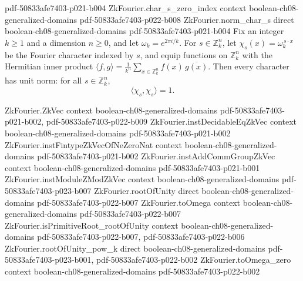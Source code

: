 \begin{lemma}
  {pdf-50833afe7403-p021-b004}
\proofstep
  {ZkFourier.char_s_zero_index}
  {context}
  {boolean-ch08-generalized-domains}
  {pdf-50833afe7403-p022-b008}
\proofstep
  {ZkFourier.norm_char_s}
  {direct}
  {boolean-ch08-generalized-domains}
  {pdf-50833afe7403-p021-b004}
Fix an integer $k \ge 1$ and a dimension $n \ge 0$, and let $\omega_k = e^{2\pi i/k}$.
For $s \in \mathbb{Z}_k^n$, let $\chi_s(x) = \omega_k^{\,s\cdot x}$ be the Fourier
character indexed by $s$, and equip functions on $\mathbb{Z}_k^n$ with the Hermitian
inner product $\langle f,g\rangle = \frac{1}{k^n}\sum_{x\in\mathbb{Z}_k^n}
f(x)\,\overline{g(x)}$. Then every character has unit norm: for all $s \in
\mathbb{Z}_k^n$, \[ \langle \chi_s, \chi_s\rangle = 1. \]
\end{lemma}

\begin{lemma}
\label{ZkFourier.inner_product_char_nonself}
\leanok
{}
\proofstep
  {ZkFourier.ZkVec}
  {context}
  {boolean-ch08-generalized-domains}
  {pdf-50833afe7403-p021-b002,
    pdf-50833afe7403-p022-b009}
\proofstep
  {ZkFourier.instDecidableEqZkVec}
  {context}
  {boolean-ch08-generalized-domains}
  {pdf-50833afe7403-p021-b002}
\proofstep
  {ZkFourier.instFintypeZkVecOfNeZeroNat}
  {context}
  {boolean-ch08-generalized-domains}
  {pdf-50833afe7403-p021-b002}
\proofstep
  {ZkFourier.instAddCommGroupZkVec}
  {context}
  {boolean-ch08-generalized-domains}
  {pdf-50833afe7403-p021-b001}
\proofstep
  {ZkFourier.instModuleZModZkVec}
  {context}
  {boolean-ch08-generalized-domains}
  {pdf-50833afe7403-p023-b007}
\proofstep
  {ZkFourier.rootOfUnity}
  {direct}
  {boolean-ch08-generalized-domains}
  {pdf-50833afe7403-p022-b007}
\proofstep
  {ZkFourier.toOmega}
  {context}
  {boolean-ch08-generalized-domains}
  {pdf-50833afe7403-p022-b007}
\proofstep
  {ZkFourier.isPrimitiveRoot_rootOfUnity}
  {context}
  {boolean-ch08-generalized-domains}
  {pdf-50833afe7403-p022-b007,
    pdf-50833afe7403-p022-b006}
\proofstep
  {ZkFourier.rootOfUnity_pow_k}
  {direct}
  {boolean-ch08-generalized-domains}
  {pdf-50833afe7403-p023-b001,
    pdf-50833afe7403-p022-b002}
\proofstep
  {ZkFourier.toOmega_zero}
  {context}
  {boolean-ch08-generalized-domains}
  {pdf-50833afe7403-p022-b002}

\end{lemma}
